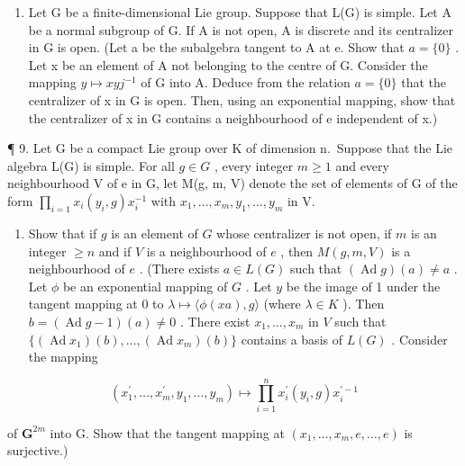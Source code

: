 \begin{enumerate}
\def\labelenumi{\arabic{enumi}.}
\setcounter{enumi}{7}
\tightlist
\item
  Let G be a finite-dimensional Lie group. Suppose that L(G) is simple. Let A be a normal subgroup of G. If A is not open, A is discrete and its centralizer in G is open. (Let a be the subalgebra tangent to A at e. Show that \(a = \{0\}\) . Let x be an element of A not belonging to the centre of G. Consider the mapping \(y \mapsto xyj^{-1}\) of G into A. Deduce from the relation \(a = \{0\}\) that the centralizer of x in G is open. Then, using an exponential mapping, show that the centralizer of x in G contains a neighbourhood of e independent of x.)
\end{enumerate}

¶ 9. Let G be a compact Lie group over K of dimension n.~Suppose that the Lie algebra L(G) is simple. For all \(g \in G\) , every integer \(m \geqslant 1\) and every neighbourhood V of e in G, let M(g, m, V) denote the set of elements of G of the form \(\prod_{i=1} x_i(y_i, g) x_i^{-1}\) with \(x_1, \ldots, x_m, y_1, \ldots, y_m\) in V.

\begin{enumerate}
\def\labelenumi{(\alph{enumi})}
\tightlist
\item
  Show that if \(g\) is an element of \(G\) whose centralizer is not open, if \(m\) is an integer \(\geqslant n\) and if \(V\) is a neighbourhood of \(e\) , then \(M(g, m, V)\) is a neighbourhood of \(e\) . (There exists \(a \in L(G)\) such that \((\operatorname{Ad} g)(a) \neq a\) . Let \(\phi\) be an exponential mapping of \(G\) . Let \(y\) be the image of 1 under the tangent mapping at 0 to \(\lambda \mapsto \langle \phi(xa), g \rangle\) (where \(\lambda \in K\) ). Then \(b = (\operatorname{Ad} g - 1)(a) \neq 0\) . There exist \(x_1, \ldots, x_m\) in \(V\) such that \(\{(\operatorname{Ad} x_1)(b), \ldots, (\operatorname{Ad} x_m)(b)\}\) contains a basis of \(L(G)\) . Consider the mapping
\end{enumerate}

\[
\left(x _ {1} ^ {\prime}, \dots , x _ {m} ^ {\prime}, y _ {1}, \dots , y _ {m}\right) \mapsto \prod_ {i = 1} ^ {n} x _ {i} ^ {\prime} (y _ {i}, g) x _ {i} ^ {\prime - 1}
\]

of \(\mathbf{G}^{2m}\) into G. Show that the tangent mapping at \((x_{1},\ldots ,x_{m},e,\ldots ,e)\) is surjective.)

